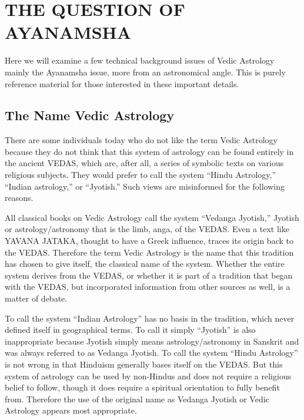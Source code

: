 \section{THE QUESTION OF AYANAMSHA}
 

Here we will examine a few technical background issues of Vedic Astrology mainly the Ayanamsha issue, more from an astronomical angle. This is purely reference material for those interested in these important details.

 

\subsection{The Name Vedic Astrology}

 

There are some individuals today who do not like the term Vedic Astrology because they do not think that this system of astrology can be found entirely in the ancient VEDAS, which are, after all, a series of symbolic texts on various religious subjects. They would prefer to call the system “Hindu Astrology,” “Indian astrology,” or “Jyotish.” Such views are misinformed for the following reasons.

 

All classical books on Vedic Astrology call the system “Vedanga Jyotish,” Jyotish or astrology/astronomy that is the limb, anga, of the VEDAS. Even a text like YAVANA JATAKA, thought to have a Greek influence, traces its origin back to the VEDAS. Therefore the term Vedic Astrology is the name that this tradition has chosen to give itself, the classical name of the system. Whether the entire system derives from the VEDAS, or whether it is part of a tradition that began with the VEDAS, but incorporated information from other sources as well, is a matter of debate.

 

To call the system “Indian Astrology” has no basis in the tradition, which never defined itself in geographical terms. To call it simply “Jyotish” is also inappropriate because Jyotish simply means astrology/astronomy in Sanskrit and was always referred to as Vedanga Jyotish. To call the system “Hindu Astrology” is not wrong in that Hinduism generally bases itself on the VEDAS. But this system of astrology can be used by non-Hindus and does not require a religious belief to follow, though it does require a spiritual orientation to fully benefit from. Therefore the use of the original name as Vedanga Jyotish or Vedic Astrology appears most appropriate.

